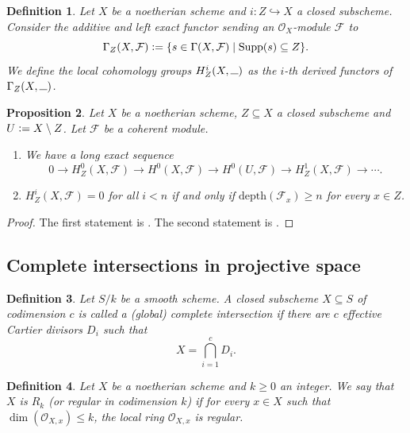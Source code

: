 \documentclass[a4paper,12pt]{amsart}
\newtheorem{definition}{Definition}[section]
\newtheorem{proposition}[definition]{Proposition}
\numberwithin{equation}{section}
\newcommand{\defeq}{\vcentcolon=}
\renewcommand{\leq}{\leqslant}
\renewcommand{\geq}{\geqslant}
\renewcommand{\_}{\rule{0.25cm}{0.4pt}}
\begin{document}
\begin{definition}
    Let $X$ be a noetherian scheme and $i\colon Z\hookrightarrow X$ a closed subscheme. Consider the additive and left exact functor sending an $\mathcal{O}_{X}$-module $\mathcal{F}$ to
    \[
    \Gamma_{Z}(X,\mathcal{F})\defeq \{s\in \Gamma(X,\mathcal{F}) \mid \text{Supp}(s)\subseteq Z\}.
    \]
    We define the local cohomology groups $H^{i}_{Z}(X,\_)$ as the $i$-th derived functors of $\Gamma_{Z}(X,\_)$.
\end{definition}

\begin{proposition}\label{propriedades cohomologia local}
    Let $X$ be a noetherian scheme, $Z\subseteq X$ a closed subscheme and $U\defeq X\setminus Z$. Let $\mathcal{F}$ be a coherent module.
    \begin{enumerate}
        \item We have a long exact sequence
        \[
        0\to H^{0}_{Z}(X,\mathcal{F})\to H^{0}(X,\mathcal{F})\to H^{0}(U,\mathcal{F})\to H^{1}_{Z}(X,\mathcal{F})\to\cdots .
        \]
        \item $H^{i}_{Z}(X,\mathcal{F})=0$ for all $i<n$ if and only if $\text{depth}(\mathcal{F}_{x})\geq n$ for every $x\in Z$.
    \end{enumerate}
\end{proposition}
\begin{proof}
    The first statement is \cite[Exposé I, Corollaire 2.9]{SGA2}. The second statement is \cite[Exposé III, Lemme 3.1.(i) and Proposition 3.3.(iv)]{SGA2}.
\end{proof}

\subsection{Complete intersections in projective space}\label{1.3}

\begin{definition}
    Let $S/k$ be a smooth scheme. A closed subscheme $X\subseteq S$ of codimension $c$ is called a (global) complete intersection if there are $c$ effective Cartier divisors $D_{i}$ such that
    \[
    X=\bigcap_{i=1}^{c}D_{i}.
    \]
\end{definition}

\begin{definition}
    Let $X$ be a noetherian scheme and $k\geq 0$ an integer. We say that $X$ is $R_{k}$ (or regular in codimension $k$) if for every $x\in X$ such that $\dim(\mathcal{O}_{X,x})\leq k$, the local ring $\mathcal{O}_{X,x}$ is regular.
\end{definition}
\end{document}
